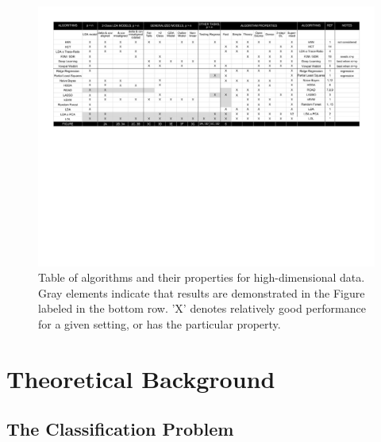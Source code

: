 \documentclass[10pt]{article}
\begin{document}
\begin{figure}
\centering
\includegraphics[width=1\linewidth,trim=0.5in 4.5in 0.5in 0.5in,clip=true]{../Figs/table} %
\caption{Table of algorithms and their properties for high-dimensional data. Gray elements indicate that results are demonstrated in the Figure labeled in the bottom row. 'X' denotes relatively good performance for a given setting, or has the particular property.
}
\label{f:table}
\end{figure}







\clearpage
\appendix

\section[theory]{Theoretical Background}


\subsection{The Classification Problem}
\end{document}
